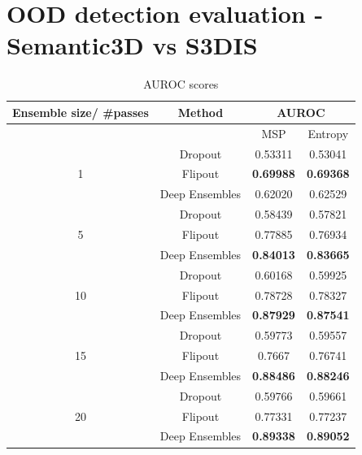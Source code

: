     \section{OOD detection evaluation - Semantic3D vs S3DIS}
    \begin{table}[h!]
        \centering
        \begin{tabular}{cccc}
        \hline
        Ensemble size/ \#passes & Method               &  \multicolumn{2}{c}{AUROC}          \\ \hline
                                &                      &  MSP              & Entropy         \\ \hline
        \multirow{3}{*}{1}      & Dropout              & 0.53311          & 0.53041          \\
                                & Flipout              & \textbf{0.69988} & \textbf{0.69368} \\
                                & Deep Ensembles       & 0.62020          & 0.62529          \\ \hline
        \multirow{3}{*}{5}      & Dropout              & 0.58439          & 0.57821          \\
                                & Flipout              & 0.77885          & 0.76934          \\
                                & Deep Ensembles       & \textbf{0.84013} & \textbf{0.83665} \\ \hline
        \multirow{3}{*}{10}     & Dropout              & 0.60168          & 0.59925          \\
                                & Flipout              & 0.78728          & 0.78327          \\
                                & Deep Ensembles       & \textbf{0.87929} & \textbf{0.87541} \\ \hline
        \multirow{3}{*}{15}     & Dropout              & 0.59773          & 0.59557          \\
                                & Flipout              & 0.7667           & 0.76741          \\
                                & Deep Ensembles       & \textbf{0.88486} & \textbf{0.88246} \\ \hline
        \multirow{3}{*}{20}     & Dropout              & 0.59766          & 0.59661          \\
                                & Flipout              & 0.77331          & 0.77237          \\
                                & Deep Ensembles       & \textbf{0.89338} & \textbf{0.89052} \\ \hline
        \end{tabular}
        \caption{AUROC scores}
    \end{table}
    
